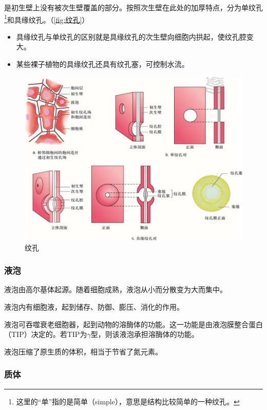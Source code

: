 是初生壁上没有被次生壁覆盖的部分。按照次生壁在此处的加厚特点，分为单纹孔\footnote{这里的“单”指的是简单（simple），意思是结构比较简单的一种纹孔。}和具缘纹孔。（\autoref{fig:纹孔}）

\begin{itemize}
	\item 具缘纹孔与单纹孔的区别就是具缘纹孔的次生壁向细胞内拱起，使纹孔腔变大。
	\item 某些裸子植物的具缘纹孔还具有纹孔塞，可控制水流。
\end{itemize}

\begin{figure}[htbp]
	\centering
	\includegraphics[width=\linewidth]{Pics/纹孔}
	\caption{纹孔}
	\label{fig:纹孔}
\end{figure}

\subsubsection{液泡}

液泡由高尔基体起源。随着细胞成熟，液泡从小而分散变为大而集中。

液泡内有细胞液，起到储存、防御、膨压、消化的作用。

液泡可吞噬衰老细胞器，起到动物的溶酶体的功能。这一功能是由液泡膜整合蛋白（TIP）决定的。若TIP为$\gamma$型，则该液泡承担溶酶体的功能。

液泡压缩了原生质的体积，相当于节省了氮元素。

\subsubsection{质体}

